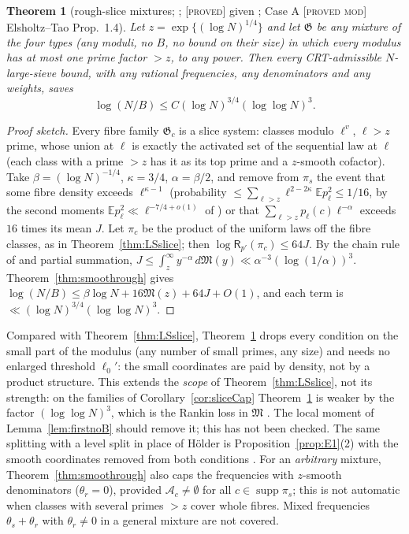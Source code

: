\documentclass[10pt,reqno]{amsart}
\newtheorem{theorem}{Theorem}[section]
\theoremstyle{definition}
\theoremstyle{remark}
\newcommand{\A}{\mathcal A}
\newcommand{\cG}{\mathfrak G}
\newcommand{\E}{\mathbb E}
\newcommand{\lab}[1]{\textup{[\textsc{#1}]}}
\begin{document}
\begin{theorem}[rough-slice mixtures; {\cite[Thm~3.1]{LS3}}; \lab{proved} given {\cite[\S\S2--4]{KA2}}; Case A \lab{proved mod} Elsholtz--Tao Prop.~1.4]\label{thm:roughslice}
Let $z=\exp\{(\log N)^{1/4}\}$ and let $\cG$ be any mixture of the four types (any
moduli, no $B$, no bound on their size) in which every modulus has at most
one prime factor $>z$, to any power.  Then every CRT-admissible
$N$-large-sieve bound, with any rational frequencies, any denominators and
any weights, saves
\[
 \log(N/B)\leq C(\log N)^{3/4}(\log\log N)^3.
\]
\end{theorem}
\begin{proof}[Proof sketch]
Every fibre family $\cG_c$ is a slice system: classes modulo $\ell^v$, $\ell>z$
prime, whose union at $\ell$ is exactly the activated set of the sequential
law at $\ell$ (each class with a prime $>z$ has it as its top prime and a
$z$-smooth cofactor).  Take $\beta=(\log N)^{-1/4}$, $\kappa=3/4$, $\alpha=\beta/2$, and
remove from $\pi_s$ the event that some fibre density exceeds $\ell^{\kappa-1}$
(probability $\leq\sum_{\ell>z}\ell^{2-2\kappa}\E p_\ell^2\leq1/16$, by the second
moments $\E p_\ell^2\ll\ell^{-7/4+o(1)}$ of \cite[Lemma~4.3]{KA2}) or that
$\sum_{\ell>z}p_\ell(c)\ell^{-\alpha}$ exceeds $16$ times its mean $J$.  Let $\pi_c$ be the
product of the uniform laws off the fibre classes, as in
Theorem~\ref{thm:LSslice}; then $\log\mathsf R_{p'}(\pi_c)\leq64J$.  By the chain rule
of \cite[\S2]{KA2} and partial summation,
$J\leq\int_z^\infty y^{-\alpha}\,d\mathfrak M(y)\ll\alpha^{-3}(\log(1/\alpha))^3$.  Theorem~\ref{thm:smoothrough}
gives $\log(N/B)\leq\beta\log N+16\mathfrak M(z)+64J+O(1)$, and each term is
$\ll(\log N)^{3/4}(\log\log N)^3$.
\end{proof}
Compared with Theorem~\ref{thm:LSslice}, Theorem~\ref{thm:roughslice} drops every
condition on the small part of the modulus (any number of small primes, any
size) and needs no enlarged threshold $\ell_0'$: the small coordinates are
paid by density, not by a product structure.  This extends the
\emph{scope} of Theorem~\ref{thm:LSslice}, not its strength: on the families of
Corollary~\ref{cor:sliceCap} Theorem~\ref{thm:roughslice} is weaker by the
factor $(\log\log N)^3$, which is the Rankin loss in $\mathfrak M$ \cite[Rem.~3.8]{KA2}.
The local moment of Lemma~\ref{lem:firstnoB} should remove it; this has not
been checked.  The same splitting with a level split in place of H\"older
is Proposition~\ref{prop:E1}(2) with the smooth coordinates removed from
both conditions \cite[Rem.~1.1(c)]{LS3}.  For an \emph{arbitrary} mixture,
Theorem~\ref{thm:smoothrough} also caps the frequencies with $z$-smooth
denominators ($\theta_r=0$), provided $\A_c\neq\emptyset$ for all $c\in\operatorname{supp}\pi_s$; this is
not automatic when classes with several primes $>z$ cover whole fibres.
Mixed frequencies $\theta_s+\theta_r$ with $\theta_r\neq0$ in a general mixture are not
covered.
\end{document}
